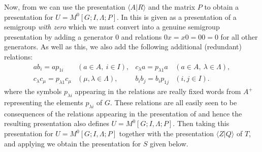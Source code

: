 \documentclass[11pt]{amsart}
\theoremstyle{plain}
\begin{document}
Now, from \cite[Theorem~6.2]{HowieAndRuskuc} we can use the presentation ${\langle} A | R {\rangle}$ and the matrix $P$ to obtain a presentation for $U = M^0[G;I,\Lambda;P]$. In \cite[Theorem~6.2]{HowieAndRuskuc} this is given as a presentation of a semigroup \emph{with zero} which we must convert into a genuine semigroup presentation by adding a generator $0$ and relations $0x=x0=00=0$ for all other generators. As well as this, we also add the following additional (redundant) relations:
\[
\begin{array}{llll}
a b_i = a p_{1 i} & (a \in A, \ i \in I), & c_{\lambda} a = p_{\lambda 1} a & (a \in A, \ \lambda \in \Lambda), \\
c_{\lambda} c_{\mu} = p_{\lambda 1} c_{\mu} & (\mu, \lambda \in \Lambda), & b_i b_j = b_i p_{1 j} & (i,j \in I).
\end{array}
\]
where the symbols $p_{\lambda i}$ appearing in the relations are really fixed words from $A^+$ representing the elements $p_{\lambda i }$ of $G$. These relations are all easily seen to be consequences of the relations appearing in the presentation of \cite[Theorem~6.2]{HowieAndRuskuc} and hence the resulting presentation also defines $U = M^0[G;I,\Lambda;P]$. Then taking this presentation for $U = M^0[G;I,\Lambda;P]$ together with the presentation ${\langle} Z | Q {\rangle}$ of $T$, and applying \cite[Proposition~4.4]{Ruskuc2} we obtain the presentation for $S$ given below.
\end{document}

